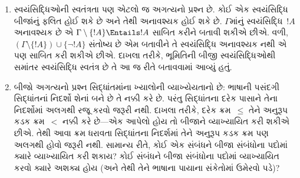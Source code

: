 \documentclass[../../../include/open-logic-section]{subfiles}
\begin{document}
\begin{explain}
\begin{enumerate}
\item સ્વયંસિદ્ધિઓની સ્વતંત્રતા પણ એટલો જ અગત્યનો પ્રશ્ન છે. કોઈ એક
  સ્વયંસિદ્ધિ બીજાંનું ફલિત હોઈ શકે છે અને તેથી અનાવશ્યક હોઈ શકે છે.
  $\Gamma$માંનું સ્વયંસિદ્ધિ~$!A$ અનાવશ્યક છે એ
  $\Gamma \setminus \{!A\} \Entails !A$ સાબિત કરીને બતાવી શકીએ છીએ.
  વળી, $(\Gamma \setminus \{!A\}) \cup \{\lnot !A\}$ સંતોષ્ય છે એમ
  બતાવીને તે સ્વયંસિદ્ધિ અનાવશ્યક નથી એ પણ સાબિત કરી શકીએ છીએ. દાખલા
  તરીકે, ભૂમિતિની બીજી સ્વયંસિદ્ધિઓથી સમાંતર સ્વયંસિદ્ધિ સ્વતંત્ર છે
  તે આ જ રીતે બતાવવામાં આવ્યું હતું.
\item બીજો અગત્યનો પ્રશ્ન સિદ્ધાંતમાંના ખ્યાલોની વ્યાખ્યેયતાનો છે:
  ભાષાની પસંદગી સિદ્ધાંતનાં નિદર્શો શેનાં બને છે તે નક્કી કરે છે.
  પરંતુ સિદ્ધાંતના દરેક પાસાને તેના નિદર્શોમાં અલગથી રજૂ કરવો જરૂરી
  નથી. દાખલા તરીકે, દરેક ક્રમ~$\le$ તેને અનુરૂપ કડક ક્રમ~$<$ નક્કી કરે
  છે---એક આપેલો હોય તો બીજાને વ્યાખ્યાયિત કરી શકીએ છીએ. તેથી આવા ક્રમ
  ધરાવતા સિદ્ધાંતના નિદર્શમાં તેને અનુરૂપ કડક ક્રમ પણ અલગથી હોવો
  જરૂરી નથી. સામાન્ય રીતે, કોઈ એક સંબંધને બીજા સંબંધોના પદોમાં ક્યારે
  વ્યાખ્યાયિત કરી શકાય? કોઈ સંબંધને બીજા સંબંધોના પદોમાં વ્યાખ્યાયિત
  કરવો ક્યારે અશક્ય હોય (અને તેથી તેને ભાષાના પાયાના સંકેતોમાં ઉમેરવો
  પડે)?
\end{enumerate}
\end{explain}
\end{document}
